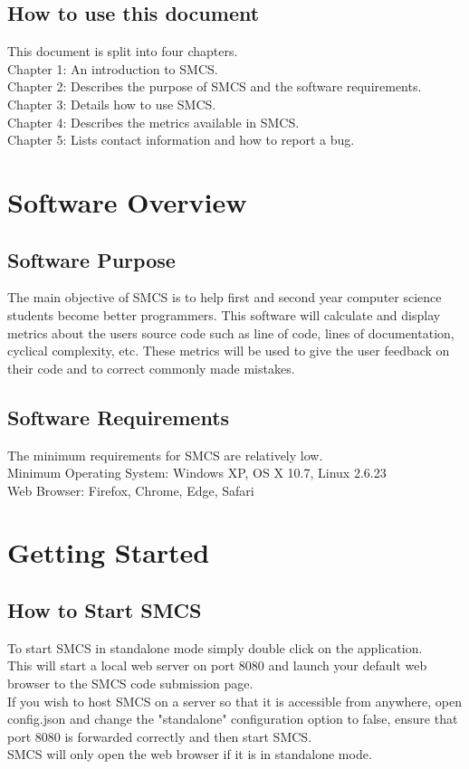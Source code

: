 \documentclass{scrreprt}
\begin{document}
	\section{How to use this document}
	This document is split into four chapters. \\
	Chapter 1: An introduction to SMCS. \\
	Chapter 2: Describes the purpose of SMCS and the software requirements. \\
	Chapter 3: Details how to use SMCS. \\
	Chapter 4: Describes the metrics available in SMCS. \\
	Chapter 5: Lists contact information and how to report a bug.
	
	{\let\clearpage\relax \chapter{Software Overview}}
	
	\section{Software Purpose}
	The main objective of SMCS is to help first and second year computer science students become better programmers.
	This software will calculate and display metrics about the users source code such as line of code, lines of documentation, cyclical complexity, etc.
	These metrics will be used to give the user feedback on their code and to correct commonly made mistakes.

	\section{Software Requirements}
	The minimum requirements for SMCS are relatively low.\\
	Minimum Operating System: Windows XP, OS X 10.7, Linux 2.6.23\\
	Web Browser: Firefox, Chrome, Edge, Safari\\

	{\let\clearpage\relax \chapter{Getting Started}}
	\section{How to Start SMCS}
	To start SMCS in standalone mode simply double click on the application. \\
	This will start a local web server on port 8080 and launch your default web browser to the SMCS code submission page. \\
	If you wish to host SMCS on a server so that it is accessible from anywhere, open config.json and change the "standalone" configuration option to false, ensure that port 8080 is forwarded correctly and then start SMCS. \\
	SMCS will only open the web browser if it is in standalone mode.
\end{document}
